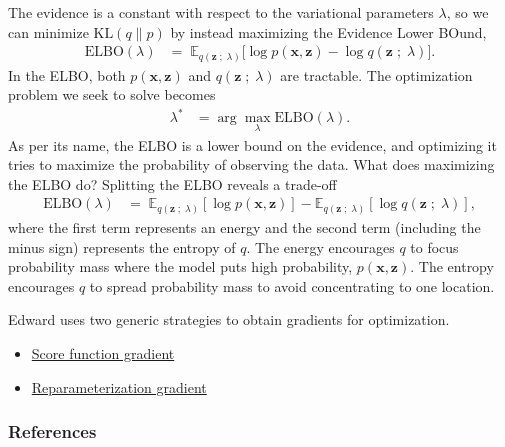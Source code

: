 The evidence is a constant with respect to the variational parameters
$\lambda$, so we can minimize $\text{KL}(q\|p)$ by instead maximizing
the Evidence Lower BOund,
\begin{align*}
  \text{ELBO}(\lambda)
  &=\;
  \mathbb{E}_{q(\mathbf{z}\;;\;\lambda)}
  \big[
  \log p(\mathbf{x}, \mathbf{z})
  -
  \log q(\mathbf{z}\;;\;\lambda)
  \big].
\end{align*}
In the ELBO, both $p(\mathbf{x}, \mathbf{z})$ and
$q(\mathbf{z}\;;\;\lambda)$ are tractable. The optimization problem we
seek to solve becomes
\begin{align*}
  \lambda^*
  &=
  \arg \max_\lambda \text{ELBO}(\lambda).
\end{align*}
As per its name, the ELBO is a lower bound on the evidence, and
optimizing it tries to maximize the probability of observing the data.
What does maximizing the ELBO do? Splitting the ELBO reveals a trade-off
\begin{align*}
  \text{ELBO}(\lambda)
  &=\;
  \mathbb{E}_{q(\mathbf{z} \;;\; \lambda)}[\log p(\mathbf{x}, \mathbf{z})]
  - \mathbb{E}_{q(\mathbf{z} \;;\; \lambda)}[\log q(\mathbf{z}\;;\;\lambda)],
\end{align*}
where the first term represents an energy and the second term
(including the minus sign) represents the entropy of $q$.
The energy encourages $q$ to focus probability mass where the
model puts high probability, $p(\mathbf{x}, \mathbf{z})$.
The entropy encourages $q$ to spread probability mass to avoid
concentrating to one location.

Edward uses two generic strategies to obtain gradients for
optimization.
\begin{itemize}
    \item \href{/tutorials/klqp-score}{Score function gradient}
    \item \href{/tutorials/klqp-reparam}{Reparameterization gradient}
  \end{itemize}

\subsubsection{References}\label{references}

